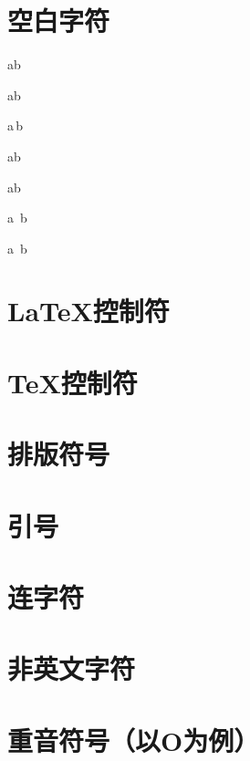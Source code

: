 \documentclass{article}
\begin{document}
    \section{空白字符}

    a\quad b %

    a\qquad b

    a\,b

    a\thinspace b

    a\enspace b

    a\ b

    a~b

    

    \section{\LaTeX 控制符}
    \section{\TeX 控制符}
    \section{排版符号}
    \section{引号}
    \section{连字符}
    \section{非英文字符}
    \section{重音符号（以O为例）}
\end{document}
